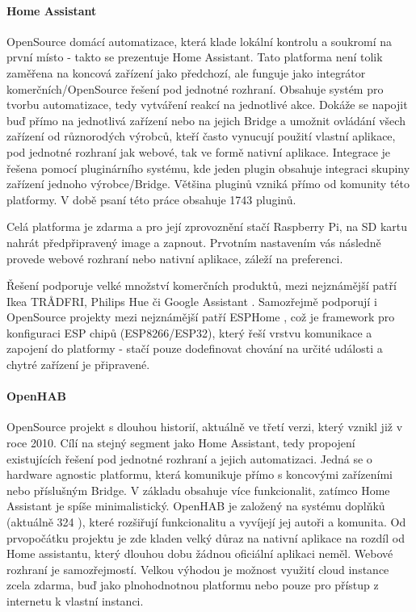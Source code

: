 \paragraph{Home Assistant}
OpenSource domácí automatizace, která klade lokální kontrolu a soukromí na první místo - takto se prezentuje Home Assistant. Tato platforma není tolik zaměřena na koncová zařízení jako předchozí, ale funguje jako integrátor komerčních/OpenSource řešení pod jednotné rozhraní. Obsahuje systém pro tvorbu automatizace, tedy vytváření reakcí na jednotlivé akce. Dokáže se napojit buď přímo na jednotlivá zařízení nebo na jejich Bridge a umožnit ovládání všech zařízení od různorodých výrobců, kteří často vynucují použití vlastní aplikace, pod jednotné rozhraní jak webové, tak ve formě nativní aplikace. Integrace je řešena pomocí pluginárního systému, kde jeden plugin obsahuje integraci skupiny zařízení jednoho výrobce/Bridge. Většina pluginů vzniká přímo od komunity této platformy. V době psaní této práce obsahuje 1743 pluginů. \cite{ha}

Celá platforma je zdarma a pro její zprovoznění stačí Raspberry Pi, na SD kartu nahrát předpřipravený image a zapnout. Prvotním nastavením vás následně provede webové rozhraní nebo nativní aplikace, záleží na preferenci. \cite{ha-doc}

Řešení podporuje velké množství komerčních produktů, mezi nejznámější patří Ikea TRÅDFRI, Philips Hue či Google Assistant \cite{ha-integrations}. Samozřejmě podporují i OpenSource projekty mezi nejznámější patří ESPHome \cite{esphome}, což je framework pro konfiguraci ESP chipů (ESP8266/ESP32), který řeší vrstvu komunikace a zapojení do platformy - stačí pouze dodefinovat chování na určité události a chytré zařízení je připravené.

\paragraph{OpenHAB}
OpenSource projekt s dlouhou historií, aktuálně ve třetí verzi, který vznikl již v roce 2010. Cílí na stejný segment jako Home Assistant, tedy  propojení existujících řešení pod jednotné rozhraní a jejich automatizaci. Jedná se o hardware agnostic platformu, která komunikuje přímo s koncovými zařízeními nebo příslušným Bridge. V základu obsahuje více funkcionalit, zatímco Home Assistant je spíše minimalistický. OpenHAB je založený na systému doplňků (aktuálně 324 \cite{openhab-addons}), které rozšiřují funkcionalitu a vyvíjejí jej autoři a komunita. Od prvopočátku projektu je zde kladen velký důraz na nativní aplikace na rozdíl od Home assistantu, který dlouhou dobu žádnou oficiální aplikaci neměl. Webové rozhraní je samozřejmostí. Velkou výhodou je možnost využití cloud instance zcela zdarma, buď jako plnohodnotnou platformu nebo pouze pro přístup z internetu k vlastní instanci. \cite{openhab}


